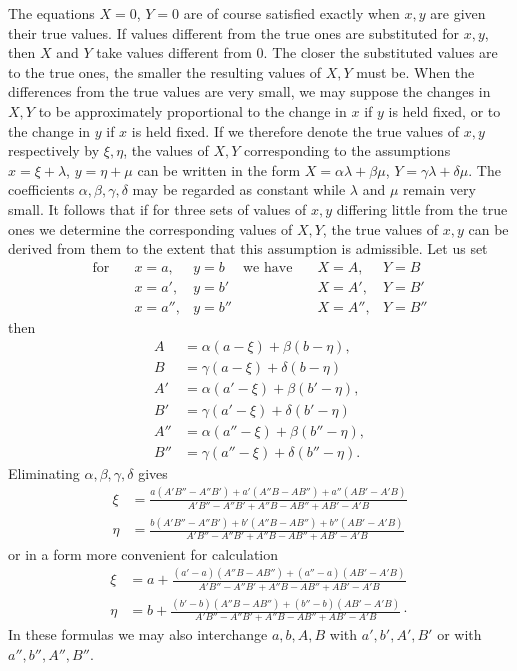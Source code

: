 The equations $X=0$, $Y=0$ are of course satisfied exactly when $x,y$ are given their true values. If values different from the true ones are substituted for $x,y$, then $X$ and $Y$ take values different from $0$. The closer the substituted values are to the true ones, the smaller the resulting values of $X,Y$ must be. When the differences from the true values are very small, we may suppose the changes in $X,Y$ to be approximately proportional to the change in $x$ if $y$ is held fixed, or to the change in $y$ if $x$ is held fixed. If we therefore denote the true values of $x,y$ respectively by $\xi,\eta$, the values of $X,Y$ corresponding to the assumptions $x=\xi+\lambda$, $y=\eta+\mu$ can be written in the form $X=\alpha\lambda+\beta\mu$, $Y=\gamma\lambda+\delta\mu$. The coefficients $\alpha,\beta,\gamma,\delta$ may be regarded as constant while $\lambda$ and $\mu$ remain very small. It follows that if for three sets of values of $x,y$ differing little from the true ones we determine the corresponding values of $X,Y$, the true values of $x,y$ can be derived from them to the extent that this assumption is admissible. Let us set
\[
\begin{array}{rlllll}
\text{for}\quad & x=a, & y=b & \text{we have}\quad & X=A, & Y=B\\
& x=a', & y=b' && X=A', & Y=B'\\
& x=a'', & y=b'' && X=A'', & Y=B''
\end{array}
\]
then
\[
\begin{aligned}
A&=\alpha(a-\xi)+\beta(b-\eta),\\
B&=\gamma(a-\xi)+\delta(b-\eta)\\
A'&=\alpha(a'-\xi)+\beta(b'-\eta),\\
B'&=\gamma(a'-\xi)+\delta(b'-\eta)\\
A''&=\alpha(a''-\xi)+\beta(b''-\eta),\\
B''&=\gamma(a''-\xi)+\delta(b''-\eta).
\end{aligned}
\]
Eliminating $\alpha,\beta,\gamma,\delta$ gives
\[
\begin{aligned}
\xi&=\frac{a(A'B''-A''B')+a'(A''B-AB'')+a''(AB'-A'B)}{A'B''-A''B'+A''B-AB''+AB'-A'B}\\[6pt]
\eta&=\frac{b(A'B''-A''B')+b'(A''B-AB'')+b''(AB'-A'B)}{A'B''-A''B'+A''B-AB''+AB'-A'B}
\end{aligned}
\]
or in a form more convenient for calculation
\[
\begin{aligned}
\xi&=a+\frac{(a'-a)(A''B-AB'')+(a''-a)(AB'-A'B)}{A'B''-A''B'+A''B-AB''+AB'-A'B}\\[6pt]
\eta&=b+\frac{(b'-b)(A''B-AB'')+(b''-b)(AB'-A'B)}{A'B''-A''B'+A''B-AB''+AB'-A'B}\mathpunct{\cdot}
\end{aligned}
\]
In these formulas we may also interchange $a,b,A,B$ with $a',b',A',B'$ or with $a'',b'',A'',B''$.

